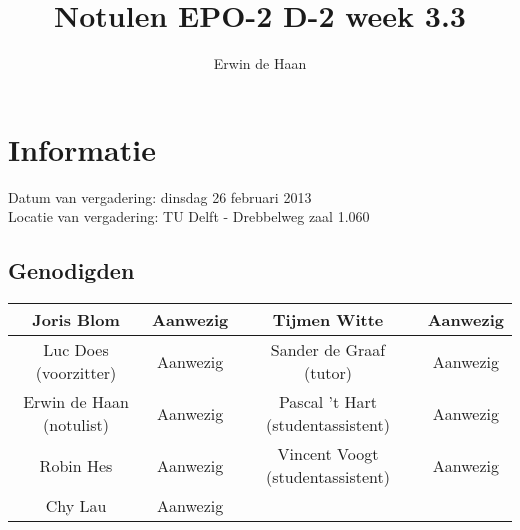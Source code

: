 \documentclass{article}
\begin{document}
\title{Notulen EPO-2 D-2 week 3.3}%
\author{Erwin de Haan}%
\maketitle

\section*{Informatie}
Datum van vergadering: dinsdag 26 februari 2013\\ %
Locatie van vergadering: TU Delft - Drebbelweg zaal 1.060 %
\subsection*{Genodigden}
\begin{center}
\begin{tabular}{|c |c |c |c |}
	\hline
	Joris Blom & Aanwezig & Tijmen Witte & Aanwezig \\
	\hline
	Luc Does (voorzitter) & Aanwezig & Sander de Graaf (tutor) & Aanwezig \\
	\hline
	Erwin de Haan (notulist) & Aanwezig & Pascal 't Hart (studentassistent) & Aanwezig \\
	\hline
	Robin Hes & Aanwezig & Vincent Voogt (studentassistent) & Aanwezig \\
	\hline
	Chy Lau & Aanwezig & & \\
	\hline
\end{tabular}
\end{center}
\end{document}
